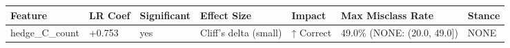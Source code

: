 \begin{tabular}{lllllll}
\toprule
Feature & LR Coef & Significant & Effect Size & Impact & Max Misclass Rate & Stance \\
\midrule
hedge\_C\_count & +0.753 & yes & Cliff's delta (small) & ↑ Correct & 49.0\% (NONE: (20.0, 49.0]) & NONE \\
\bottomrule
\end{tabular}
